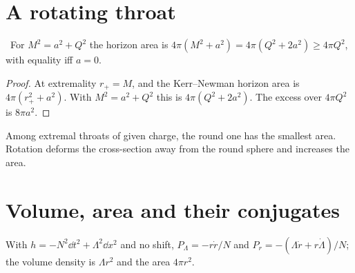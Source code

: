 \section{A rotating throat}

\begin{proposition}\label{prop:kn}\ver\
For $M^2=a^2+Q^2$ the horizon area is $4\pi(M^2+a^2)=4\pi(Q^2+2a^2)\ge4\pi Q^2$, with equality iff $a=0$.
\end{proposition}
\begin{proof}
At extremality $r_+=M$, and the Kerr--Newman horizon area is $4\pi(r_+^2+a^2)$. With $M^2=a^2+Q^2$ this is $4\pi(Q^2+2a^2)$. The excess over $4\pi Q^2$ is $8\pi a^2$.
\end{proof}


Among extremal throats of given charge, the round one has the smallest area. Rotation deforms the cross-section away from the round sphere and increases the area.

\section{Volume, area and their conjugates}

With $h=-N^2\dd t^2+\Lambda^2\dd x^2$ and no shift, $P_\Lambda=-r\dot r/N$ and $P_r=-(\Lambda\dot r+r\dot\Lambda)/N$; the volume density is $\Lambda r^2$ and the area $4\pi r^2$.

